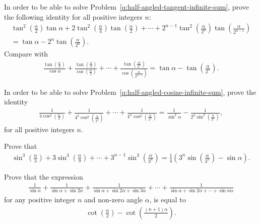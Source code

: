 \documentclass[12pt,a4paper]{memoir}
\theoremstyle{definition}
\begin{document}
\begin{question}\label{q:half-angled-tangent-finite-sum}
	In order to be able to solve Problem~\ref{q:half-angled-tangent-infinite-sum}, prove the following identity for all positive integers $n$:
	\begin{multline*}
		\tan^2\left(\frac{\alpha}{2}\right)\tan \alpha + 2\tan^2\left(\frac{\alpha}{4}\right)\tan\left(\frac{\alpha}{2}\right)+ \cdots + 2^{n-1}\tan^2\left(\frac{\alpha}{2^n}\right)\tan\left(\frac{\alpha}{2^{n-1}}\right) \\= \tan \alpha - 2^n\tan\left(\frac{\alpha}{2^n}\right).
	\end{multline*}
	Compare with
	\begin{align*}
		\displaystyle \frac{\tan\left(\frac{\alpha}{2}\right)}{\cos \alpha} + \frac{\tan\left(\frac{\alpha}{4}\right)}{\cos\left(\frac{\alpha}{2}\right)} + \cdots + \frac{\tan\left(\frac{\alpha}{2^n}\right)}{\cos\left(\frac{\alpha}{2^{n-1}}\right)} = \tan \alpha - \tan\left(\frac{\alpha}{2^n}\right).
	\end{align*}
\end{question}



\begin{question}\label{q:half-angled-cosine-finite-sum}
	In order to be able to solve Problem~\ref{q:half-angled-cosine-infinite-sum}, prove the identity
	\begin{align*}
		\frac{1}{\displaystyle 4\cos^2\left(\frac{\alpha}{2}\right)}+\frac{1}{\displaystyle 4^2\cos^2\left(\frac{\alpha}{2^2}\right)} + \cdots + \frac{1}{\displaystyle 4^n\cos^2\left(\frac{\alpha}{2^n}\right)} = \frac{1}{\sin^2 \alpha} - \frac{1}{2^n\sin^2\left(\frac{\alpha}{2^n}\right)},
	\end{align*}
	for all positive integers $n$.
\end{question}


\begin{question}
	Prove that
	\begin{align*}
		\sin^3\left(\frac{\alpha}{3}\right) + 
		3\sin^3\left(\frac{\alpha}{9}\right) + \cdots +  
		3^{n-1}\sin^3\left(\frac{\alpha}{3^n}\right) = \frac{1}{4}\left(3^{n}\sin\left(\frac{\alpha}{3^n}\right)-\sin\alpha\right).
	\end{align*}
\end{question}


\begin{question}
	Prove that the expression
	\begin{align*}
		\frac{1}{\sin \alpha} + \frac{1}{\sin\alpha+\sin 2\alpha} + \frac{1}{\sin\alpha + \sin 2\alpha + \sin 3\alpha} + \cdots + \frac{1}{\sin\alpha + \sin 2\alpha + \cdots + \sin n\alpha}
	\end{align*}
	for any positive integer $n$ and non-zero angle $\alpha$, is equal to
	\begin{align*}
		\cot\left(\frac{\alpha}{2}\right) - \cot\left(\frac{(n+1)\alpha}{2}\right).
	\end{align*}
\end{question}
\end{document}
